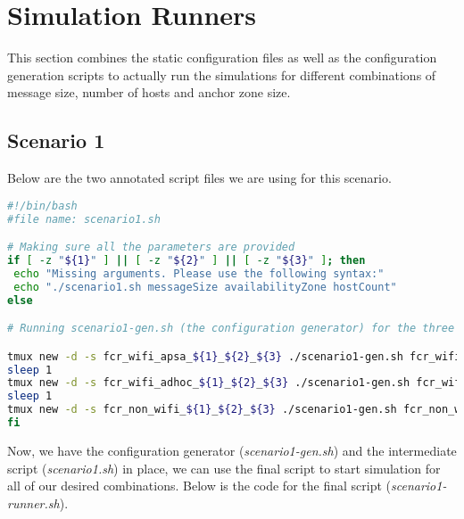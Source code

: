 \section{Simulation Runners}
This section combines the static configuration files as well as the configuration generation scripts to actually run the simulations for different combinations of message size, number of hosts and anchor zone size.

\subsection{Scenario 1}
Below are the two annotated script files we are using for this scenario.

\begin{lstlisting}[language=bash]
#!/bin/bash
#file name: scenario1.sh

# Making sure all the parameters are provided
if [ -z "${1}" ] || [ -z "${2}" ] || [ -z "${3}" ]; then
 echo "Missing arguments. Please use the following syntax:"
 echo "./scenario1.sh messageSize availabilityZone hostCount"
else

# Running scenario1-gen.sh (the configuration generator) for the three different scenarios (non access points enabled hosts, adhoc hosts and access-points enabled hosts). We are using tmux so that each task starts in its own detachable process.

tmux new -d -s fcr_wifi_apsa_${1}_${2}_${3} ./scenario1-gen.sh fcr_wifi_apsa WifiInterface FloatingContentRouter ${3} apsa ${1} ${2}
sleep 1
tmux new -d -s fcr_wifi_adhoc_${1}_${2}_${3} ./scenario1-gen.sh fcr_wifi_adhoc WifiInterface FloatingContentRouter ${3} adhoc ${1} ${2}
sleep 1
tmux new -d -s fcr_non_wifi_${1}_${2}_${3} ./scenario1-gen.sh fcr_non_wifi SimpleBroadcastInterface FloatingContentRouter ${3} apsa ${1} ${2}
fi
\end{lstlisting}
\vspace{5mm}
Now, we have the configuration generator (\textit{scenario1-gen.sh}) and the intermediate script (\textit{scenario1.sh}) in place, we can use the final script to start simulation for all of our desired combinations. Below is the code for the final script (\textit{scenario1-runner.sh}).

